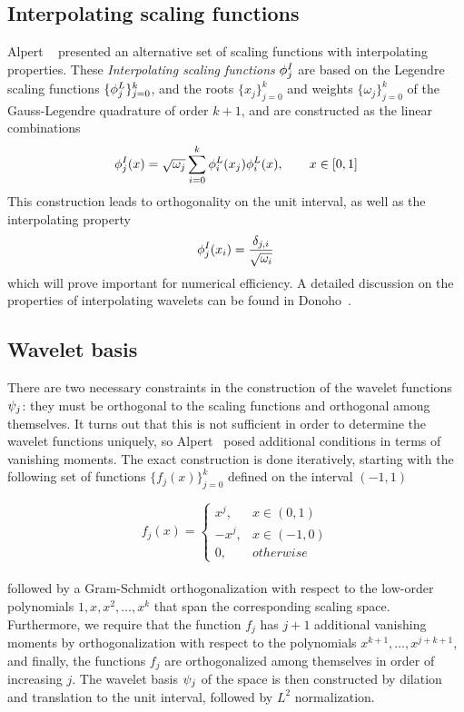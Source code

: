 \subsection{Interpolating scaling functions}
Alpert \etal~\cite{Alpert:2002p149} presented an alternative set of scaling functions 
with interpolating properties. These \emph{Interpolating scaling functions} 
$\phi_j^I$ are based on the Legendre scaling functions $\lbrace \phi_j^L
\rbrace_{j=0}^k$, and the roots $\lbrace x_j\rbrace_{j=0}^k$ and weights
$\lbrace \omega_j \rbrace_{j=0}^k$ of the Gauss-Legendre quadrature of order 
$k+1$, and are constructed as the linear combinations
\begin{equation}
    \label{eq:interpolating}
    \phi_j^I(x) = \sqrt{\omega_j}\sum_{i=0}^{k} 
	\phi_i^L(x_j)\phi_i^L(x),\qquad x \in [0,1]
\end{equation}
This construction leads to orthogonality on the unit interval, as well as the 
interpolating property
\begin{equation}
    \label{eq:interprop}
    \phi_j^I(x_i) = \frac{\delta_{j,i}}{\sqrt{\omega_i}}
\end{equation}
which will prove important for numerical efficiency. A detailed discussion on 
the properties of interpolating wavelets can be found in Donoho~\cite{Donoho:1992}.

\subsection{Wavelet basis}
There are two necessary constraints in the construction of the wavelet functions
$\psi_j$: they must be orthogonal to the scaling functions and orthogonal among 
themselves. It turns out that this is not sufficient in order to determine the wavelet 
functions uniquely, so Alpert~\cite{Alpert:1993p5460} posed additional conditions in 
terms of vanishing moments. The exact construction is done iteratively, starting with 
the following set of functions $\lbrace f_j(x) \rbrace_{j=0}^k$ defined on the interval 
$(-1,1)$

\begin{equation}
    f_j(x) = 
    \left\{
	\begin{array}{lll}
	    x^j,	& x \in (0,1)\\
	    -x^j,	& x \in (-1,0)\\
	    0,		& otherwise
	\end{array}
    \right.
\end{equation}
\ \\
\noindent
followed by a Gram-Schmidt orthogonalization with respect to the low-order polynomials
$1,x,x^2,\dots,x^k$ that span the corresponding scaling space. Furthermore, we require
that the function $f_j$ has $j+1$ additional vanishing moments by orthogonalization 
with respect to the polynomials $x^{k+1},\dots,x^{j+k+1}$, and finally, the functions
$f_j$ are orthogonalized among themselves in order of increasing $j$. The wavelet basis 
$\psi_j$ of the space  is then constructed by dilation and 
translation to the unit interval, followed by $L^2$ normalization.

